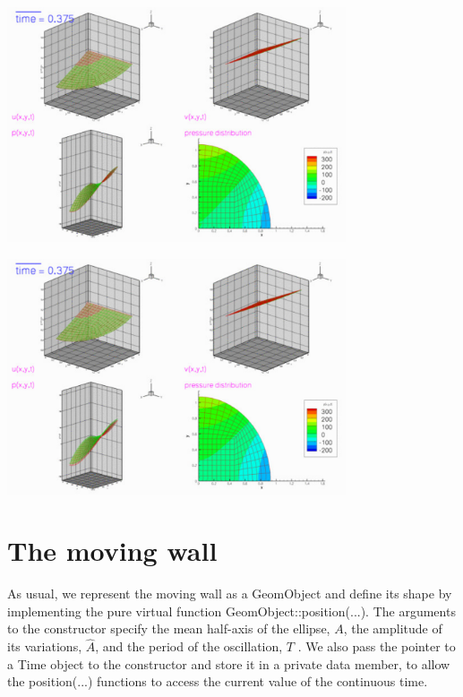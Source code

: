  
\begin{DoxyImage}
\includegraphics[width=0.75\textwidth]{CR}
\end{DoxyImage}


 
\begin{DoxyImage}
\includegraphics[width=0.75\textwidth]{TH}
\end{DoxyImage}




 

\hypertarget{index_wall}{}\section{The moving wall}\label{index_wall}
As usual, we represent the moving wall as a {\ttfamily Geom\+Object} and define its shape by implementing the pure virtual function {\ttfamily Geom\+Object\+::position}(...). The arguments to the constructor specify the mean half-\/axis of the ellipse, $ A $, the amplitude of its variations, $ \widehat{A} $, and the period of the oscillation, $ T $ . We also pass the pointer to a {\ttfamily Time} object to the constructor and store it in a private data member, to allow the {\ttfamily position}(...) functions to access the current value of the continuous time.

